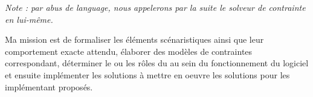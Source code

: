 \emph{Note : par abus de language, nous appelerons par la suite \csp{} le solveur de contrainte en lui-même.}

Ma mission est de formaliser les éléments scénaristiques ainsi que leur comportement exacte attendu, élaborer des modèles de contraintes correspondant, déterminer le ou les rôles du \csp{} au sein du fonctionnement du logiciel et ensuite implémenter les solutions à mettre en oeuvre les solutions pour les implémentant proposés.


\printglossary[type=\acronymtype]
 
\printglossary